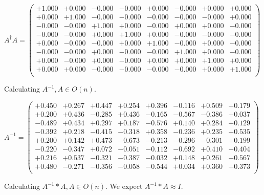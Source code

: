 \documentclass[9pt]{article}
\theoremstyle{plain}
\theoremstyle{definition}
\theoremstyle{remark}
\numberwithin{equation}{section}
\begin{document}
$A^{\dag} A = \left(
\begin{array}{
cccccccc}
+1.000 & +0.000 & -0.000 & -0.000 & +0.000 & -0.000 & +0.000 & +0.000 \\
+0.000 & +1.000 & -0.000 & -0.000 & -0.000 & -0.000 & -0.000 & +0.000 \\
-0.000 & -0.000 & +1.000 & +0.000 & -0.000 & +0.000 & +0.000 & -0.000 \\
-0.000 & -0.000 & +0.000 & +1.000 & +0.000 & -0.000 & -0.000 & -0.000 \\
+0.000 & -0.000 & -0.000 & +0.000 & +1.000 & -0.000 & +0.000 & -0.000 \\
-0.000 & -0.000 & +0.000 & -0.000 & -0.000 & +1.000 & +0.000 & -0.000 \\
+0.000 & -0.000 & +0.000 & -0.000 & +0.000 & +0.000 & +1.000 & +0.000 \\
+0.000 & +0.000 & -0.000 & -0.000 & -0.000 & -0.000 & +0.000 & +1.000 \\
\end{array}
\right)$ \newline 

Calculating $A^{-1} ,  A \in O(n)$.

$A^{-1} = \left(
\begin{array}{
cccccccc}
+0.450 & +0.267 & +0.447 & +0.254 & +0.396 & -0.116 & +0.509 & +0.179 \\
+0.200 & +0.436 & -0.285 & +0.436 & -0.165 & -0.567 & -0.386 & +0.037 \\
-0.489 & +0.434 & +0.297 & +0.187 & -0.576 & +0.140 & +0.284 & +0.129 \\
-0.392 & +0.218 & -0.415 & -0.318 & +0.358 & -0.236 & +0.235 & +0.535 \\
+0.200 & +0.142 & +0.473 & -0.673 & -0.213 & -0.296 & -0.301 & +0.199 \\
-0.220 & -0.347 & +0.072 & -0.051 & -0.112 & -0.692 & +0.410 & -0.404 \\
+0.216 & +0.537 & -0.321 & -0.387 & -0.032 & +0.148 & +0.261 & -0.567 \\
+0.480 & -0.271 & -0.356 & -0.058 & -0.544 & +0.034 & +0.360 & +0.373 \\
\end{array}
\right)$ \newline 

Calculating $A^{-1} *A  ,  A \in O(n)$.   We expect $A^{-1} *A  \approx I$. 
\end{document}

